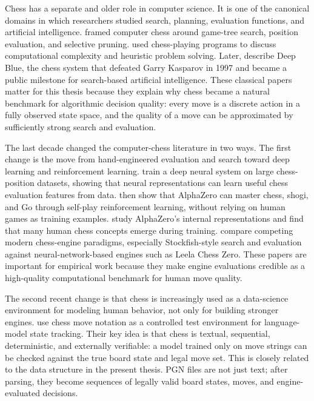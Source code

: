Chess has a separate and older role in computer science. It is one of the canonical domains in which researchers studied search, planning, evaluation functions, and artificial intelligence. \citet{shannon1950programming} framed computer chess around game-tree search, position evaluation, and selective pruning. \citet{newell1958chess} used chess-playing programs to discuss computational complexity and heuristic problem solving. Later, \citet{campbell2002deepblue} describe Deep Blue, the chess system that defeated Garry Kasparov in 1997 and became a public milestone for search-based artificial intelligence. These classical papers matter for this thesis because they explain why chess became a natural benchmark for algorithmic decision quality: every move is a discrete action in a fully observed state space, and the quality of a move can be approximated by sufficiently strong search and evaluation.

The last decade changed the computer-chess literature in two ways. The first change is the move from hand-engineered evaluation and search toward deep learning and reinforcement learning. \citet{david2016deepchess} train a deep neural system on large chess-position datasets, showing that neural representations can learn useful chess evaluation features from data. \citet{silver2018alphazero} then show that AlphaZero can master chess, shogi, and Go through self-play reinforcement learning, without relying on human games as training examples. \citet{mcgrath2022alphazero} study AlphaZero's internal representations and find that many human chess concepts emerge during training. \citet{maharaj2022chessai} compare competing modern chess-engine paradigms, especially Stockfish-style search and evaluation against neural-network-based engines such as Leela Chess Zero. These papers are important for empirical work because they make engine evaluations credible as a high-quality computational benchmark for human move quality.

The second recent change is that chess is increasingly used as a data-science environment for modeling human behavior, not only for building stronger engines. \citet{toshniwal2022chess} use chess move notation as a controlled test environment for language-model state tracking. Their key idea is that chess is textual, sequential, deterministic, and externally verifiable: a model trained only on move strings can be checked against the true board state and legal move set. This is closely related to the data structure in the present thesis. PGN files are not just text; after parsing, they become sequences of legally valid board states, moves, and engine-evaluated decisions.

